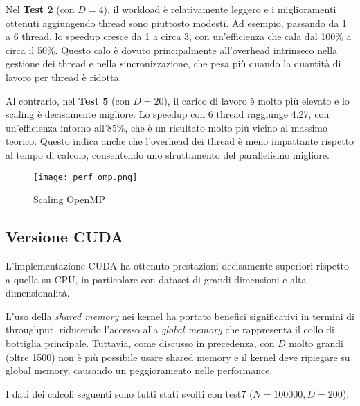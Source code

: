 \documentclass[a4paper,12pt,oneside]{article}
\begin{document}
Nel \textbf{Test 2} (con $D=4$), il workload è relativamente leggero e i miglioramenti ottenuti aggiungendo thread sono piuttosto modesti. Ad esempio, passando da 1 a 6 thread, lo speedup cresce da 1 a circa 3, con un'efficienza che cala dal 100\% a circa il 50\%. Questo calo è dovuto principalmente all’overhead intrinseco nella gestione dei thread e nella sincronizzazione, che pesa più quando la quantità di lavoro per thread è ridotta.

Al contrario, nel \textbf{Test 5} (con $D=20$), il carico di lavoro è molto più elevato e lo scaling è decisamente migliore. Lo speedup con 6 thread raggiunge 4.27, con un’efficienza intorno all’85\%, che è un risultato molto più vicino al massimo teorico. Questo indica anche che l’overhead dei thread è meno impattante rispetto al tempo di calcolo, consentendo uno sfruttamento del parallelismo migliore.

\begin{figure}[H]
    \centering
    \texttt{[image: perf\_omp.png]}
    \caption{Scaling OpenMP}
    \label{fig:perf-omp}
\end{figure}

\subsection{Versione CUDA}
L’implementazione CUDA ha ottenuto prestazioni decisamente superiori rispetto a quella su CPU, in particolare con dataset di grandi dimensioni e alta dimensionalità.

L’uso della \textit{shared memory} nei kernel ha portato benefici significativi in termini di throughput, riducendo l’accesso alla \textit{global memory} che rappresenta il collo di bottiglia principale. Tuttavia, come discusso in precedenza, con $D$ molto grandi (oltre 1500) non è più possibile usare shared memory e il kernel deve ripiegare su global memory, causando un peggioramento nelle performance.

\scriptsize I dati dei calcoli seguenti sono tutti stati svolti con test7 ($N = 100000, D = 200$). \normalsize

\begin{table}[H]
\caption{Performance secondo \emph{NVIDIA Nsight Compute}}
\end{table}
\end{document}
